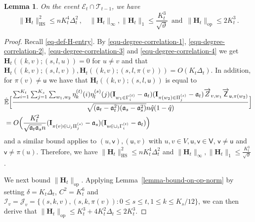\documentclass[11pt]{article}
\newtheorem{Lemma}[Theorem]{Lemma}
\numberwithin{equation}{section}
\begin{document}
\begin{Lemma} {\label{lemma-op-norm-H}}
On the event $\mathcal{E}_t \cap \mathcal{T}_{t-1}$, we have 
$$\| \mathbf{H}_{t} \|_{\mathrm{HS}}^2 \leq n K_t^4 \Delta_t^2\,, \quad \| \mathbf{H}_{t} \|_{\infty}, \| \mathbf{H}_{t} \|_{1} \leq \frac{K^3_t}{\sqrt{\vartheta}} \, \mbox{ and } \,\| \mathbf{H}_{t} \|_{\mathrm{op}} \leq 2 K_{t}^3\,.$$
\end{Lemma}
\begin{proof}
Recall \eqref{eq-def-H-entry}. By \eqref{equ-degree-correlation-1}, \eqref{equ-degree-correlation-2}, \eqref{equ-degree-correlation-3} and \eqref{equ-degree-correlation-4} we get  $\mathbf{H}_{t} ((k,v);(s,l,u)) = 0$ for $u \neq v$ and that
$
    \mathbf{H}_{t} ((k,v);(s,l,v)), \mathbf{H}_{t} ((k,v);(s,l,\pi(v))) = O(K_{t} \Delta_{t})
$.
In addition, for $\pi(v) \neq \mathsf{u} $ we have that $ \mathbf{H}_{t} ( (k,v);(s,l,\mathsf{u}) )$ is equal to
\begin{align*}
    &\Hat{\mathbb{E}} \Big[  \frac{ \sum_{i=1}^{K_{t}} \sum_{j=1}^{K_s} \sum_{w_1,w_2} \eta^{(t)}_k(i) \eta^{(s)}_l (j) (\mathbf{I}_{w_1 \in \Gamma^{(t)}_i} - \mathfrak{a}_t) (\mathbf{I}_{\pi(w_2) \in \Pi^{(s)}_j} - \mathfrak{a}_t) \overrightarrow{Z}_{v,w_1} \overrightarrow{\mathsf{Z}}_{\mathsf{u},\pi(w_2)} }{ \sqrt{(\mathfrak{a}_t-\mathfrak{a}_t^2) (\mathfrak{a}_s-\mathfrak{a}_s^2) } n \Hat{q}(1-\Hat{q}) }  \Big]  \\
    &= O \Big( \frac{ K^2_{t} }{ \sqrt{\mathfrak{a}_t \mathfrak{a}_s} n }   (\mathbf{I}_{ \pi(v) \in \cup_{j} \Pi^{(s)}_j} - \mathfrak{a}_s) (\mathbf{I}_{u \in \cup_{i} \Gamma^{(t)}_i} - \mathfrak{a}_t) \Big)
\end{align*}
and a similar bound applies to $(u, \mathsf v), (\mathsf u, v)$ with $u, v\in V, \mathsf u, \mathsf v\in \mathsf V$, $\mathsf v \neq \mathsf u$ and $\mathsf v \neq \pi(u)$. Therefore, we have $\| \mathbf{H}_{t} \|_{\mathrm{HS}}^2 \leq n K_t^4 \Delta_t^2$ and $\| \mathbf{H}_{t} \|_{\infty}, \| \mathbf{H}_{t} \|_{1} \leq \frac{K^3_t}{\sqrt{\vartheta}}$. 

We next bound $\| \mathbf{H}_{t} \|_{\mathrm{op}}$. Applying Lemma~\ref{lemma-bound-on-op-norm} by setting  $\delta = K_t \Delta_t$, $C^2 = K_t^6$ and $\mathcal{I}_{v} = \mathcal{J}_{v} = \{ (s,k,v),(s,k,\pi(v)): 0\leq s\leq t, 1\leq k\leq K_s/12 \}$, we can then derive that $\| \mathbf{H}_t \|_{\mathrm{op}} \leq K_t^3 + 4K_t^2 \Delta_t \leq 2 K_t^3$.
\end{proof}
\end{document}
